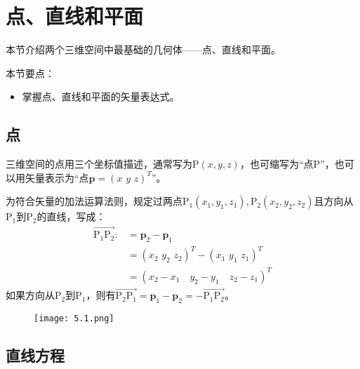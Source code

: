 \section{点、直线和平面}

本节介绍两个三维空间中最基础的几何体——点、直线和平面。

本节要点：
\begin{itemize}
    \item 掌握点、直线和平面的矢量表达式。
\end{itemize}

\subsection{点}

\begin{definition}[点]
三维空间的点用三个坐标值描述，通常写为$\mathrm{P}\left( x,y,z \right) $，也可缩写为“点$\mathrm{P}$”，也可以用矢量表示为“点$\boldsymbol{p}=\left( x\,\,y\,\,z \right) ^T$”。
\end{definition}

为符合矢量的加法运算法则，规定过两点$\mathrm{P}_1\left( x_1,y_1,z_1 \right) ,\mathrm{P}_2\left( x_2,y_2,z_2 \right) $且方向从$\mathrm{P}_1$到$\mathrm{P}_2$的直线，写成：
\begin{align*}
\overrightarrow{\mathrm{P}_1\mathrm{P}_2}:&=\boldsymbol{p}_2-\boldsymbol{p}_1 \\
&=\left( x_2\,\,y_2\,\,z_2 \right) ^T-\left( x_1\,\,y_1\,\,z_1 \right) ^T \\
&=\left( x_2-x_1 \quad y_2-y_1 \quad z_2-z_1 \right) ^T
\end{align*}
如果方向从$\mathrm{P}_2$到$\mathrm{P}_1$，则有$\overrightarrow{\mathrm{P}_2\mathrm{P}_1}=\boldsymbol{p}_1-\boldsymbol{p}_2=-\overrightarrow{\mathrm{P}_1\mathrm{P}_2}$。

\begin{figure}[h]
\centering
\texttt{[image: 5.1.png]}
\end{figure}

\subsection{直线方程}

